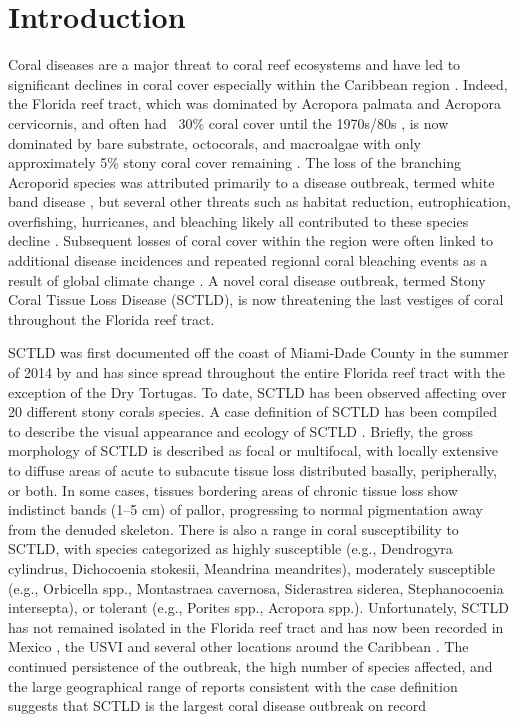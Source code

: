 \documentclass[utf8]{frontiersSCNS}
\begin{document}
\section{Introduction}

Coral diseases are a major threat to coral reef ecosystems and have led to significant declines in coral cover especially within the Caribbean region  \citep{richardson1998florida, sutherland2004disease, aronson2001white, harvell2007coral, miller2009coral, brandt2009dynamics}. Indeed, the Florida reef tract, which was dominated by Acropora palmata and Acropora cervicornis, and often had ~30\% coral cover until the 1970s/80s \citep{dustan1987changes, porter1992quantification}, is now dominated by bare substrate, octocorals, and macroalgae with only approximately 5\% stony coral cover remaining \citep{ruzicka2013temporal}. The loss of the branching Acroporid species was attributed primarily to a disease outbreak, termed white band disease \citep{aronson2001white}, but several other threats such as habitat reduction, eutrophication, overfishing, hurricanes, and bleaching likely all contributed to these species decline \citep{acropora2005atlantic}. Subsequent losses of coral cover within the region were often linked to additional disease incidences and repeated regional coral bleaching events as a result of global climate change \citep{kuta1996abundance, richardson1998florida, sutherland2004disease, gardner2003long, aronson2006conservation, kuffner2015century, manzello2015rapid}. A novel coral disease outbreak, termed Stony Coral Tissue Loss Disease (SCTLD), is now threatening the last vestiges of coral throughout the Florida reef tract.

SCTLD was first documented off the coast of Miami-Dade County in the summer of 2014 by \cite{precht2016unprecedented} and has since spread throughout the entire Florida reef tract with the exception of the Dry Tortugas. To date, SCTLD has been observed affecting over 20 different stony corals species. A case definition of SCTLD has been compiled to describe the visual appearance and ecology of SCTLD \citep{noaa2018}. Briefly, the gross morphology of SCTLD is described as focal or multifocal, with locally extensive to diffuse areas of acute to subacute tissue loss distributed basally, peripherally, or both. In some cases, tissues bordering areas of chronic tissue loss show indistinct bands (1–5 cm) of pallor, progressing to normal pigmentation away from the denuded skeleton. There is also a range in coral susceptibility to SCTLD, with species categorized as highly susceptible (e.g., Dendrogyra cylindrus, Dichocoenia stokesii, Meandrina meandrites), moderately susceptible (e.g., Orbicella spp., Montastraea cavernosa, Siderastrea siderea, Stephanocoenia intersepta), or tolerant (e.g., Porites spp., Acropora spp.). Unfortunately, SCTLD has not remained isolated in the Florida reef tract and has now been recorded in Mexico \citep{alvarez2019rapid}, the USVI \citep{blondeau2020coral} and several other locations around the Caribbean \citep{kramer2019map}. The continued persistence of the outbreak, the high number of species affected, and the large geographical range of reports consistent with the case definition suggests that SCTLD is the largest coral disease outbreak on record 
\end{document}
